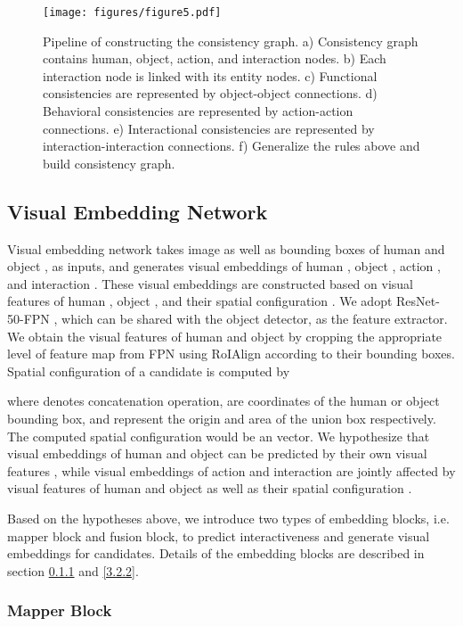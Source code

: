 \documentclass[sigconf,screen]{acmart}
\begin{document}
\begin{figure*}
\centering
\texttt{[image: figures/figure5.pdf]}
\caption{Pipeline of constructing the consistency graph. a) Consistency graph contains human, object, action, and interaction nodes. b) Each interaction node is linked with its entity nodes. c) Functional consistencies are represented by object-object connections. d) Behavioral consistencies are represented by action-action connections. e) Interactional consistencies are represented by interaction-interaction connections. f) Generalize the rules above and build consistency graph.}
\label{fig5}
\end{figure*}

\subsection{Visual Embedding Network}\label{3.2}

Visual embedding network takes image  as well as bounding boxes of human and object ,  as inputs, and generates visual embeddings of human , object , action , and interaction . These visual embeddings are constructed based on visual features of human , object , and their spatial configuration . We adopt ResNet-50-FPN \cite{he2016deep,lin2017feature}, which can be shared with the object detector, as the feature extractor. We obtain the visual features of human and object by cropping the appropriate level of feature map from FPN using RoIAlign \cite{he2017mask} according to their bounding boxes. Spatial configuration of a candidate is computed by

where  denotes concatenation operation,  are coordinates of the human or object bounding box,  and  represent the origin and area of the union box respectively. The computed spatial configuration  would be an  vector. We hypothesize that visual embeddings of human and object can be predicted by their own visual features , while visual embeddings of action and interaction are jointly affected by visual features of human and object  as well as their spatial configuration .

Based on the hypotheses above, we introduce two types of embedding blocks, i.e. mapper block and fusion block, to predict interactiveness  and generate visual embeddings  for candidates. Details of the embedding blocks are described in section \ref{3.2.1} and \ref{3.2.2}.

\subsubsection{Mapper Block}\label{3.2.1}
\end{document}
